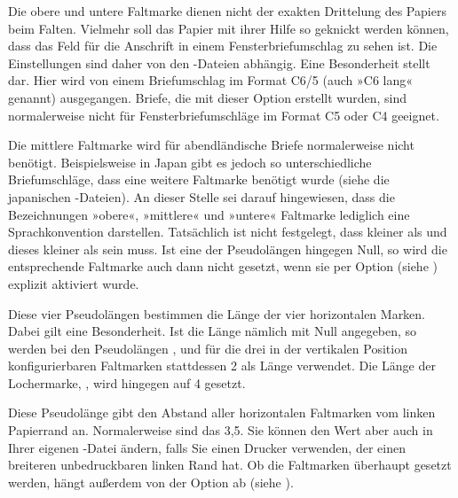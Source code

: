 Die obere und untere Faltmarke dienen nicht der exakten
Drittelung des Papiers beim Falten. Vielmehr soll das Papier mit ihrer Hilfe
so geknickt werden können, dass das Feld für die Anschrift in einem
Fensterbriefumschlag zu sehen ist. Die Einstellungen sind daher von den
-Dateien%
 abhängig. Eine
Besonderheit stellt  dar. Hier wird
von einem Briefumschlag im Format C6/5 (auch »C6 lang« genannt)
ausgegangen. Briefe, die mit dieser Option erstellt wurden, sind normalerweise
nicht für Fensterbriefumschläge im Format C5 oder C4 geeignet.

Die mittlere Faltmarke wird für abendländische Briefe normalerweise nicht
benötigt. Beispielsweise in Japan gibt es jedoch so unterschiedliche
Briefumschläge, dass eine weitere Faltmarke benötigt wurde (siehe die
japanischen -Dateien). An dieser Stelle sei darauf hingewiesen, dass
die Bezeichnungen »obere«, »mittlere« und »untere« Faltmarke lediglich eine
Sprachkonvention darstellen. Tatsächlich ist nicht festgelegt, dass
 kleiner als  und dieses kleiner
als  sein muss. Ist eine der
Pseudolängen hingegen Null, so wird die entsprechende Faltmarke auch dann
nicht gesetzt, wenn sie per Option %
%
 (siehe
) explizit aktiviert wurde.%
\EndIndexGroup


\begin{Declaration}
\end{Declaration}
Diese vier Pseudolängen bestimmen die
Länge der vier horizontalen Marken. Dabei gilt eine
Besonderheit. Ist die Länge nämlich mit Null angegeben, so
werden bei den Pseudolängen ,
 und  für die drei in der
vertikalen Position konfigurierbaren Faltmarken stattdessen 2 als
Länge verwendet. Die Länge der Lochermarke, , wird
hingegen auf 4 gesetzt.%
\EndIndexGroup


\begin{Declaration}
\end{Declaration}
Diese Pseudolänge gibt den Abstand aller horizontalen Faltmarken vom linken
Papier\-rand an.  Normalerweise sind das 3{,}5. Sie
können den Wert aber auch in Ihrer eigenen -Datei ändern, falls Sie
einen Drucker verwenden, der einen breiteren unbedruckbaren linken Rand
hat. Ob die Faltmarken überhaupt gesetzt werden, hängt außerdem von der Option
%
%
 ab (siehe
).%
%
\EndIndexGroup


